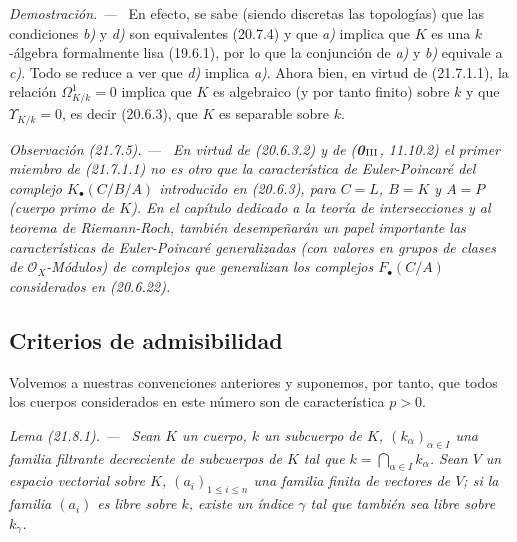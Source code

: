 \documentclass[10pt,oneside]{book}
\makeatletter
\newcommand{\setmanualcurrentlabel}[1]{\def\@currentlabel{#1}}
\newenvironment{remark}[1][]{%
  \setmanualcurrentlabel{#1}\par\medskip\noindent\itshape Observación (#1). ---\ }{\par}
\newenvironment{lemma}[1][]{%
  \setmanualcurrentlabel{#1}\par\medskip\noindent\itshape Lema (#1). ---\ }{\par}
\newenvironment{proof}{%
  \par\medskip\noindent\textit{Demostración. ---\ }}{\par}
\makeatother
\begin{document}
\begin{proof}
En efecto, se sabe (siendo discretas las topologías) que las condiciones \emph{b)} y
\emph{d)} son equivalentes (20.7.4) y que \emph{a)} implica que $K$ es una $k$-álgebra
formalmente lisa (19.6.1), por lo que la conjunción de \emph{a)} y \emph{b)} equivale a \emph{c)}.
Todo se reduce a ver que \emph{d)} implica \emph{a)}. Ahora bien, en virtud de (21.7.1.1),
la relación $\Omega^1_{K/k}=0$ implica que $K$ es algebraico (y por tanto finito)
sobre $k$ y que $\Upsilon_{K/k}=0$, es decir (20.6.3), que $K$ es separable
sobre $k$.
\end{proof}

\begin{remark}[21.7.5]
\label{0.21.7.5-es}
En virtud de (20.6.3.2) y de (\textbf{0}$_{\rm III}$, 11.10.2) el primer miembro de
(21.7.1.1) no es otro que la \emph{característica de Euler-Poincaré} del
complejo $K_\bullet(C/B/A)$ introducido en (20.6.3), para $C=L$, $B=K$ y
$A=P$ (cuerpo primo de $K$). En el capítulo dedicado a la teoría de
intersecciones y al teorema de Riemann-Roch, también desempeñarán un papel
importante las características de Euler-Poincaré generalizadas (con valores
en grupos de clases de $\mathcal O_X$-Módulos) de complejos que generalizan
los complejos $F_\bullet(C/A)$ considerados en (20.6.22).
\end{remark}

\subsection{Criterios de admisibilidad}
\label{subsection:0.21.8-es}

Volvemos a nuestras convenciones anteriores y suponemos, por tanto, que todos
los cuerpos considerados en este número son de característica $p>0$.

\begin{lemma}[21.8.1]
\label{0.21.8.1-es}
Sean $K$ un cuerpo, $k$ un subcuerpo de $K$, $(k_\alpha)_{\alpha\in I}$ una
familia filtrante decreciente de subcuerpos de $K$ tal que
$k=\bigcap_{\alpha\in I}k_\alpha$. Sean $V$ un espacio vectorial sobre $K$,
$(a_i)_{1\leqslant i\leqslant n}$ una familia finita de vectores de $V$; si la
familia $(a_i)$ es libre sobre $k$, existe un índice $\gamma$ tal que también
sea libre sobre $k_\gamma$.
\end{lemma}
\end{document}
